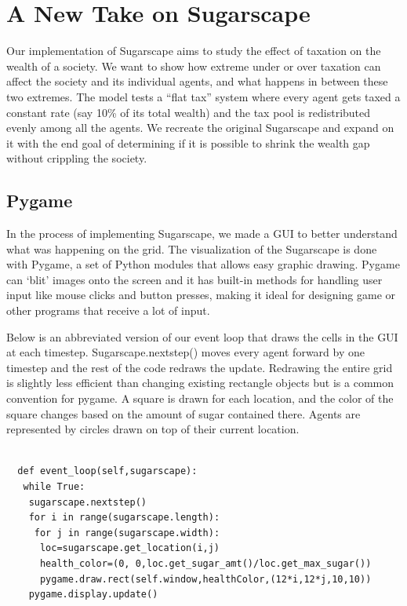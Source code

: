 \section{A New Take on Sugarscape}

Our implementation of Sugarscape aims to study the effect of taxation on the wealth of a society. We want to show how extreme under or over taxation can affect the society and its individual agents, and what happens in between these two extremes. The model tests a “flat tax” system where every agent gets taxed a constant rate (say 10\% of its total wealth) and the tax pool is redistributed evenly among all the agents. We recreate the original Sugarscape and expand on it with the end goal of determining if it is possible to shrink the wealth gap without crippling the society.

\subsection{Pygame}

In the process of implementing Sugarscape, we made a GUI to better understand what was happening on the grid. The visualization of the Sugarscape is done with Pygame, a set of Python modules that allows easy graphic drawing. Pygame can ‘blit’ images onto the screen and it has built-in methods for handling user input like mouse clicks and button presses, making it ideal for designing game or other programs that receive a lot of input.

Below is an abbreviated version of our event loop that draws the cells in the GUI at each timestep. Sugarscape.nextstep() moves every agent forward by one timestep and the rest of the code redraws the update. Redrawing the entire grid is slightly less efficient than changing existing rectangle objects but is a common convention for pygame. A square is drawn for each location, and the color of the square changes based on the amount of sugar contained there. Agents are represented by circles drawn on top of their current location.

\begin{verbatim}

  def event_loop(self,sugarscape):
   while True:
    sugarscape.nextstep()
    for i in range(sugarscape.length):
     for j in range(sugarscape.width):
      loc=sugarscape.get_location(i,j)
      health_color=(0, 0,loc.get_sugar_amt()/loc.get_max_sugar())
      pygame.draw.rect(self.window,healthColor,(12*i,12*j,10,10))
    pygame.display.update()
\end{verbatim}

